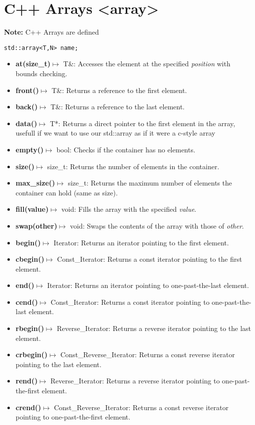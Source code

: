 \documentclass{report}
\begin{document}
    \pagebreak \bigbreak \noindent 
    \section{C++ Arrays <array>}
    \bigbreak \noindent 
    \textbf{Note:} C++ Arrays are defined
    \smallbreak \noindent
    \begin{verbatim}
std::array<T,N> name;
    \end{verbatim}
    \begin{itemize}
        \item \textbf{at(size\_t)}$\mapsto$ T\&: Accesses the element at the specified \textit{position} with bounds checking.
        \item \textbf{front()}$\mapsto$ T\&: Returns a reference to the first element.
        \item \textbf{back()}$\mapsto$ T\&: Returns a reference to the last element.
        \item \textbf{data()}$\mapsto$ T*: Returns a direct pointer to the first element in the array, usefull if we want to use our std::array as if it were a c-style array
        \item \textbf{empty()}$\mapsto$ bool: Checks if the container has no elements.
        \item \textbf{size()}$\mapsto$ size\_t: Returns the number of elements in the container.
        \item \textbf{max\_size()}$\mapsto$ size\_t: Returns the maximum number of elements the container can hold (same as size).
        \item \textbf{fill(value)}$\mapsto$ void: Fills the array with the specified \textit{value}.
        \item \textbf{swap(other)}$\mapsto$ void: Swaps the contents of the array with those of \textit{other}.
        \item \textbf{begin()}\(\mapsto\) Iterator: Returns an iterator pointing to the first element.
        \item \textbf{cbegin()}\(\mapsto\) Const\_Iterator: Returns a const iterator pointing to the first element.
        \item \textbf{end()}\(\mapsto\) Iterator: Returns an iterator pointing to one-past-the-last element.
        \item \textbf{cend()}\(\mapsto\) Const\_Iterator: Returns a const iterator pointing to one-past-the-last element.
        \item \textbf{rbegin()}\(\mapsto\) Reverse\_Iterator: Returns a reverse iterator pointing to the last element.
        \item \textbf{crbegin()}\(\mapsto\) Const\_Reverse\_Iterator: Returns a const reverse iterator pointing to the last element.
        \item \textbf{rend()}\(\mapsto\) Reverse\_Iterator: Returns a reverse iterator pointing to one-past-the-first element.
        \item \textbf{crend()}\(\mapsto\) Const\_Reverse\_Iterator: Returns a const reverse iterator pointing to one-past-the-first element.
    \end{itemize}
\end{document}
